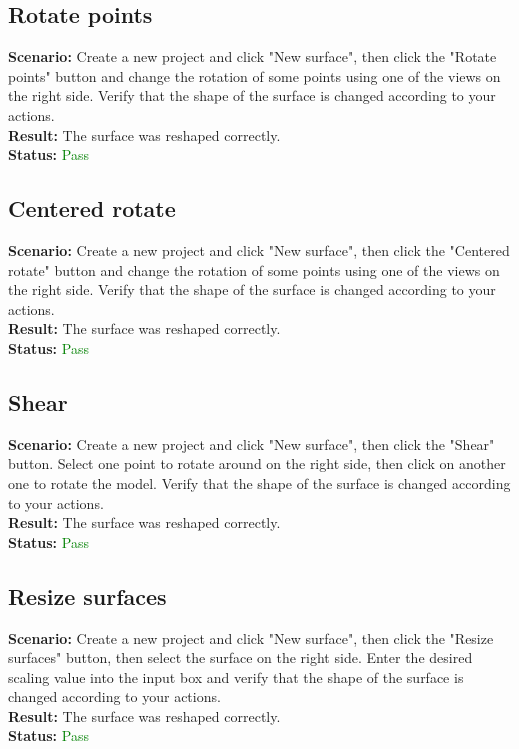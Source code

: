 \documentclass[a4paper, 11pt, article]{report}
\begin{document}
\subsection{Rotate points}

\noindent \textbf{Scenario:} Create a new project and click "New surface", then click the "Rotate points" button and change the rotation of some points using one of the views on the right side. Verify that the shape of the surface is changed according to your actions.
\\
\noindent \textbf{Result:} The surface was reshaped correctly.
\\
\noindent \textbf{Status:} \textcolor{green}{Pass}

\subsection{Centered rotate}

\noindent \textbf{Scenario:} Create a new project and click "New surface", then click the "Centered rotate" button and change the rotation of some points using one of the views on the right side. Verify that the shape of the surface is changed according to your actions.
\\
\noindent \textbf{Result:} The surface was reshaped correctly.
\\
\noindent \textbf{Status:} \textcolor{green}{Pass}

\subsection{Shear}

\noindent \textbf{Scenario:} Create a new project and click "New surface", then click the "Shear" button. Select one point to rotate around on the right side, then click on another one to rotate the model. Verify that the shape of the surface is changed according to your actions.
\\
\noindent \textbf{Result:} The surface was reshaped correctly.
\\
\noindent \textbf{Status:} \textcolor{green}{Pass}

\subsection{Resize surfaces}

\noindent \textbf{Scenario:} Create a new project and click "New surface", then click the "Resize surfaces" button, then select the surface on the right side. Enter the desired scaling value into the input box and verify that the shape of the surface is changed according to your actions.
\\
\noindent \textbf{Result:} The surface was reshaped correctly.
\\
\noindent \textbf{Status:} \textcolor{green}{Pass}
\end{document}
